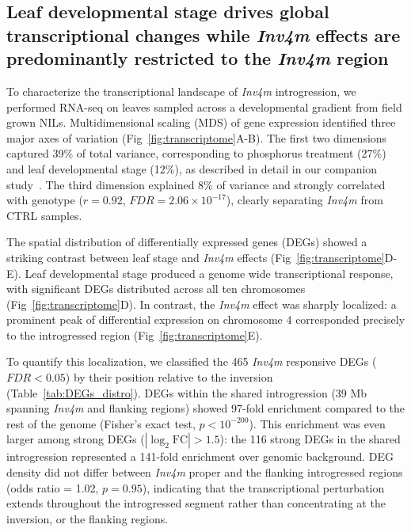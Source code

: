 \documentclass[9pt,twocolumn,twoside]{rilabRxiv}
\newcommand{\invfour}{\textit{Inv4m}\xspace}
\begin{document}


\subsection*{Leaf developmental stage drives global transcriptional changes while \invfour effects are predominantly restricted to the \invfour region}

To characterize the transcriptional landscape of \invfour introgression, we performed RNA-seq on leaves sampled across a developmental gradient from field grown NILs.
Multidimensional scaling (MDS) of gene expression identified three major axes of variation (Fig~\ref{fig:transcriptome}A-B).
The first two dimensions captured 39\% of total variance, corresponding to phosphorus treatment (27\%) and leaf developmental stage (12\%), as described in detail in our companion study~\cite{rodriguez2026phosphorus}.
The third dimension explained 8\% of variance and strongly correlated with genotype ($r = 0.92$, $\textit{FDR} = 2.06 \times 10^{-17}$), clearly separating \invfour from CTRL samples.

The spatial distribution of differentially expressed genes (DEGs) showed a striking contrast between leaf stage and \invfour effects (Fig~\ref{fig:transcriptome}D-E).
Leaf developmental stage produced a genome wide transcriptional response, with significant DEGs distributed across all ten chromosomes (Fig~\ref{fig:transcriptome}D).
In contrast, the \invfour effect was sharply localized: a prominent peak of differential expression on chromosome 4 corresponded precisely to the introgressed region (Fig~\ref{fig:transcriptome}E).

To quantify this localization, we classified the 465 \invfour responsive DEGs ($\textit{FDR} < 0.05$) by their position relative to the inversion (Table~\ref{tab:DEGs_distro}).
DEGs within the shared introgression (39 Mb spanning \invfour and flanking regions) showed 97-fold enrichment compared to the rest of the genome (Fisher's exact test, $p < 10^{-200}$).
This enrichment was even larger among strong DEGs ($|\log_2 \text{FC}| > 1.5$): the 116 strong DEGs in the shared introgression represented a 141-fold enrichment over genomic background.
DEG density did not differ between \invfour proper and the flanking introgressed regions (odds ratio = 1.02, $p = 0.95$), indicating that the transcriptional perturbation extends throughout the introgressed segment rather than concentrating at the inversion, or the flanking regions.
\end{document}
